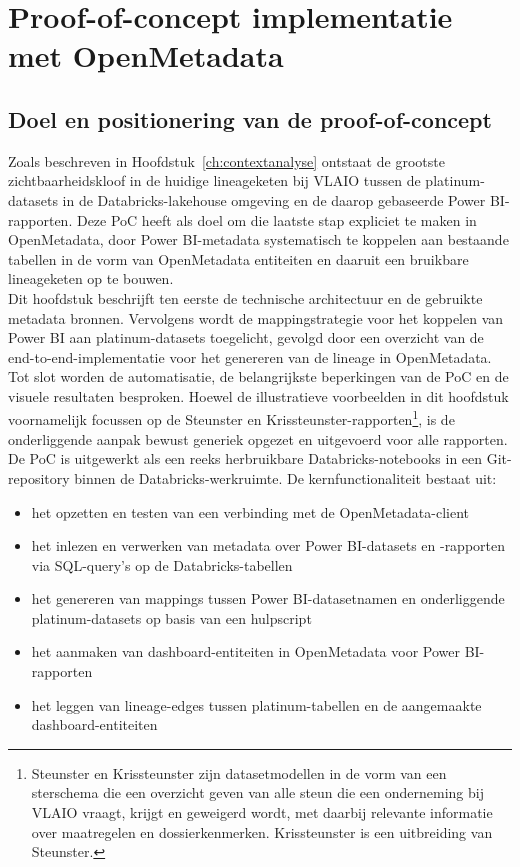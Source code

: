 \chapter{Proof-of-concept implementatie met OpenMetadata}
\label{ch:poc-implementatie}

\section{Doel en positionering van de proof-of-concept}

Zoals beschreven in Hoofdstuk~\ref{ch:contextanalyse} ontstaat de grootste zichtbaarheids\-kloof in de huidige lineageketen bij VLAIO tussen de platinum-datasets in de Databricks-lake\-house omgeving en de daarop gebaseerde Power BI-rapporten. Deze PoC heeft als doel om die laatste stap expliciet te maken in OpenMetadata, door Power BI-metadata systematisch te koppelen aan bestaande tabellen in de vorm van OpenMetadata entiteiten en daaruit een bruikbare lineageketen op te bouwen.\\

Dit hoofdstuk beschrijft ten eerste de technische architectuur en de gebruikte metadata bronnen. Vervolgens wordt de mappingstrategie voor het koppelen van Power BI aan platinum-datasets toegelicht, gevolgd door een overzicht van de end-to-end-implementatie voor het genereren van de lineage in OpenMetadata. Tot slot worden de automatisatie, de belangrijkste beperkingen van de PoC en de visuele resultaten besproken. Hoewel de illustratieve voorbeelden in dit hoofdstuk voornamelijk focussen op de Steunster en Krissteunster-rapporten\footnote{Steunster en Krissteunster zijn datasetmodellen in de vorm van een sterschema die een overzicht geven van alle steun die een onderneming bij VLAIO vraagt, krijgt en geweigerd wordt, met daarbij relevante informatie over maatregelen en dossierkenmerken. Krissteunster is een uitbreiding van Steunster.}, is de onderliggende aanpak bewust generiek opgezet en uitgevoerd voor alle rapporten.\\

De PoC is uitgewerkt als een reeks herbruikbare Databricks-notebooks in een Git-repository binnen de Databricks-werkruimte. De kernfunctionaliteit bestaat uit:
\begin{itemize}
	\item het opzetten en testen van een verbinding met de OpenMetadata-client
	\item het inlezen en verwerken van metadata over Power BI-datasets en -rapporten via SQL-query's op de Databricks-tabellen
	\item het genereren van mappings tussen Power BI-datasetnamen en onder\-liggen\-de platinum-datasets op basis van een hulpscript
	\item het aanmaken van dash\-board-en\-ti\-tei\-ten in OpenMetadata voor Power BI-rap\-por\-ten
	\item het leggen van lineage-edges tussen platinum-tabellen en de aangemaakte dash\-board-en\-ti\-tei\-ten
\end{itemize}


